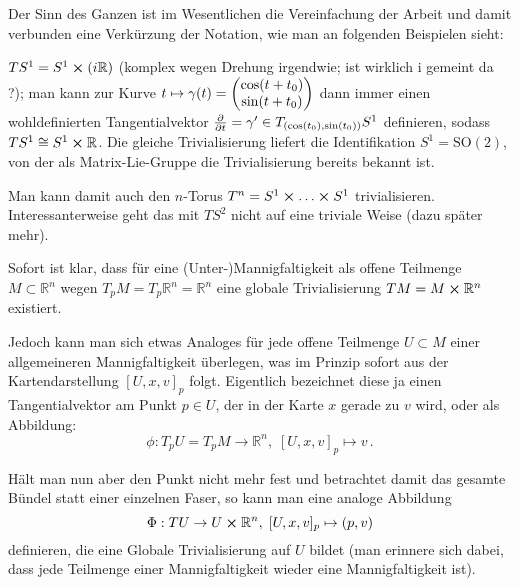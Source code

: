\documentclass[../H_Analysis_main.tex]{subfiles}
\begin{document}
Der Sinn des Ganzen ist im Wesentlichen die Vereinfachung der Arbeit und damit verbunden eine Verkürzung der Notation, wie man an folgenden Beispielen sieht:
\begin{bsp}[Sphäre]
$T S^1 = S^1 \cross \qty(i \mathbb{R})$ (komplex wegen Drehung irgendwie; ist wirklich i gemeint da ?); man kann zur Kurve $ t \mapsto \gamma(t) = \mqty(\cos(t + t_0) \\ \sin(t + t_0))$ dann immer einen wohldefinierten Tangentialvektor $\pdv{t} = \gamma' \in T_{(\cos(t_0), \sin(t_0))} S^1$%
definieren, sodass $TS^1 \cong S^1 \cross \mathbb{R}$. Die gleiche Trivialisierung liefert die Identifikation $S^1 = \text{SO}(2)$, von der als Matrix-Lie-Gruppe die Trivialisierung bereits bekannt ist.

Man kann damit auch den $n$-Torus $T^n = S^1 \cross \dots \cross S^1$ trivialisieren. Interessanterweise geht das mit $TS^2$ nicht auf eine triviale Weise (dazu später mehr).
\end{bsp}

\begin{bsp}
Sofort ist klar, dass für eine (Unter-)Mannigfaltigkeit als offene Teilmenge $M \subset \mathbb{R}^n$ wegen $T_p M = T_p \mathbb{R}^n = \mathbb{R}^n$ eine globale Trivialisierung $TM = M \cross \mathbb{R}^n$ existiert.

Jedoch kann man sich etwas Analoges für jede offene Teilmenge $U \subset M$ einer allgemeineren Mannigfaltigkeit überlegen, was im Prinzip sofort aus der Kartendarstellung $[U, x, v]_p$ folgt. Eigentlich bezeichnet diese ja einen Tangentialvektor am Punkt $p \in U$, der in der Karte $x$ gerade zu $v$ wird, oder als Abbildung:
\begin{equation*}
\phi: T_p U = T_p M \rightarrow \mathbb{R}^n, \; [U, x, v]_p \mapsto v \, .
\end{equation*}

Hält man nun aber den Punkt nicht mehr fest und betrachtet damit das gesamte Bündel statt einer einzelnen Faser, so kann man eine analoge Abbildung
\begin{equation}
\Phi: TU \rightarrow U \cross \mathbb{R}^n, \; [U, x, v]_p \mapsto (p, v)
\end{equation}
definieren, die eine Globale Trivialisierung auf $U$ bildet (man erinnere sich dabei, dass jede Teilmenge einer Mannigfaltigkeit wieder eine Mannigfaltigkeit ist).
\end{bsp}
\end{document}
